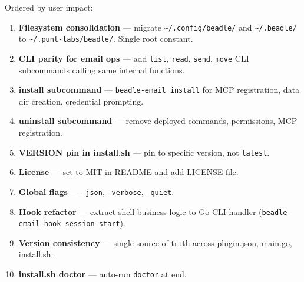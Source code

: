 \documentclass[a4paper,10pt]{article}
\begin{document}
Ordered by user impact:

\begin{enumerate}
  \item \textbf{Filesystem consolidation} --- migrate
    \texttt{\textasciitilde/.config/beadle/} and
    \texttt{\textasciitilde/.beadle/} to
    \texttt{\textasciitilde/.punt-labs/beadle/}. Single root constant.
  \item \textbf{CLI parity for email ops} --- add \texttt{list}, \texttt{read},
    \texttt{send}, \texttt{move} CLI subcommands calling same internal functions.
  \item \textbf{install subcommand} --- \texttt{beadle-email install} for
    MCP registration, data dir creation, credential prompting.
  \item \textbf{uninstall subcommand} --- remove deployed commands, permissions,
    MCP registration.
  \item \textbf{VERSION pin in install.sh} --- pin to specific version, not
    \texttt{latest}.
  \item \textbf{License} --- set to MIT in README and add LICENSE file.
  \item \textbf{Global flags} --- \texttt{--json}, \texttt{--verbose},
    \texttt{--quiet}.
  \item \textbf{Hook refactor} --- extract shell business logic to Go CLI
    handler (\texttt{beadle-email hook session-start}).
  \item \textbf{Version consistency} --- single source of truth across
    plugin.json, main.go, install.sh.
  \item \textbf{install.sh doctor} --- auto-run \texttt{doctor} at end.
\end{enumerate}
\end{document}
